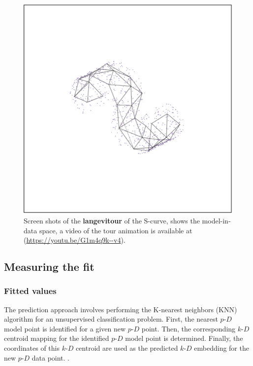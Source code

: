 \documentclass[
  12pt]{article}
\newcommand\pD{$p\text{-}D$}
\newcommand\kD{$k\text{-}D$}
\begin{document}
\begin{figure}[H]
%
\begin{minipage}{0.33\linewidth}
\includegraphics{figures/scurve/sc_3.png}\end{minipage}%

\caption{\label{fig-scurve_sc}Screen shots of the \textbf{langevitour}
of the S-curve, shows the model-in-data space, a video of the tour
animation is available at (\url{https://youtu.be/G1m4q9k--v4}).}

\end{figure}%

\subsection{Measuring the fit}\label{sec-summary}

\subsubsection{Fitted values}\label{fitted-values}

The prediction approach involves performing the K-nearest neighbors
(KNN) algorithm for an unsupervised classification problem. First, the
nearest \pD{} model point is identified for a given new \pD{} point.
Then, the corresponding \kD{} centroid mapping for the identified \pD{}
model point is determined. Finally, the coordinates of this \kD{}
centroid are used as the predicted \kD{} embedding for the new \pD{}
data point. .
\end{document}
